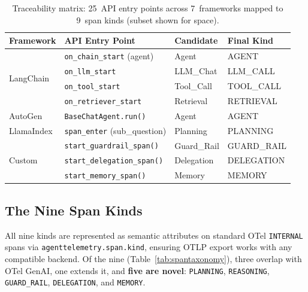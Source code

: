\documentclass{article}
\begin{document}
\begin{table}[t]
\centering
\scriptsize
\caption{Traceability matrix: 25~API entry points across 7~frameworks
mapped to 9~span kinds (subset shown for space).}
\label{tab:traceability}
\begin{tabular}{@{}llll@{}}
\toprule
\textbf{Framework} & \textbf{API Entry Point} & \textbf{Candidate} & \textbf{Final Kind} \\
\midrule
\multirow{4}{*}{LangChain}
  & \texttt{on\_chain\_start} (agent) & Agent & AGENT \\
  & \texttt{on\_llm\_start} & LLM\_Chat & LLM\_CALL \\
  & \texttt{on\_tool\_start} & Tool\_Call & TOOL\_CALL \\
  & \texttt{on\_retriever\_start} & Retrieval & RETRIEVAL \\
\midrule
AutoGen & \texttt{BaseChatAgent.run()} & Agent & AGENT \\
\midrule
LlamaIndex & \texttt{span\_enter} (sub\_question) & Planning & PLANNING \\
\midrule
\multirow{3}{*}{Custom}
  & \texttt{start\_guardrail\_span()} & Guard\_Rail & GUARD\_RAIL \\
  & \texttt{start\_delegation\_span()} & Delegation & DELEGATION \\
  & \texttt{start\_memory\_span()} & Memory & MEMORY \\
\bottomrule
\end{tabular}
\end{table}

\subsection{The Nine Span Kinds}

All nine kinds are represented as semantic attributes on standard OTel
\texttt{INTERNAL} spans via \texttt{agenttelemetry.span.kind},
ensuring OTLP export works with any compatible backend.  Of the nine
(Table~\ref{tab:spantaxonomy}), three overlap with OTel GenAI, one
extends it, and \textbf{five are novel}: \texttt{PLANNING},
\texttt{REASONING}, \texttt{GUARD\_RAIL}, \texttt{DELEGATION}, and
\texttt{MEMORY}.
\end{document}
